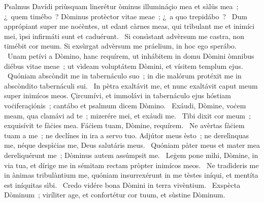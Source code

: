 { Psalmus Davídi priùsquam linerétur}
{%
òminus illumináçio mea et sàlüs mea~; ¿~quem timébo~? Dòminus protèctor vitae meae~; ¿~a quo trepidábo~? 
~Dum apprópiant super me noċèntes, ut edant càrnes meas, qui trìbulant me et inimíci mei, ìpsi infirmáti sunt et caduérunt. 
~Si consìstant advèrsum me castra, non timébit cor meum. Si exsùrgat advèrsum me práelium, in hoc ego sperábo. 
~Unam petívi a Dòmino, hanc requírem, ut inhábitem in domu Dòmini òmnibus diébus vitae meae~; ut vìdeam voluptátem Dòmini, et vísitem templum ejus. 
~Quóniam abscòndit me in tabernáculo suo~; in die malórum protéxit me in abscòndito tabernáculi sui. 
~In pètra exaltávit me, et nunc exaltávit caput meum super inimícos meos. Çircumívi, et immolávi in tabernáculo ejus hóstiam voċiferaçiónis~; cantábo et psalmum dicem Dòmino. 
~Exáudi, Dòmine, voċem meam, qua clamávi ad te~; mizerére mei, et exáudi me. 
~Tìbi dixit cor meum~; exquisívit te fàċies mea. Fáċiem tuam, Dòmine, requírem. 
~Ne avèrtas fàċiem tuam a me~; ne declínes in ira a servo tuo. Adjútor meus èsto~; ne derelìnquas me, néque despìċias me, Deus salutáris meus. 
~Quóniam pàter meus et mater mea dereliquérunt me~; Dòminus autem assúmpsit me. 
~Leġem pone mìhi, Dòmine, in via tua, et dírige me in sémitam rectam pròpter inimícos meos. 
~Ne tradìderis me in ànimas tribulàntium me, quóniam insurrexérunt in me tèstes iníqui, et mentíta est iníquitas sìbi. 
~Credo vidére bona Dòmini in terra vivèntium. 
~Exspècta Dòminum~; viríliter age, et confortétur cor tuum, et sùstine Dòminum. 
}

